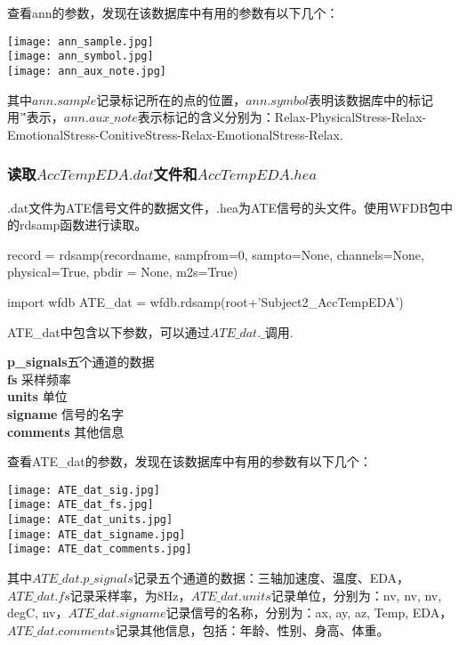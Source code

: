 \documentclass[UTF8]{ctexart}
\begin{document}
查看ann的参数，发现在该数据库中有用的参数有以下几个：
\begin{center} 
\texttt{[image: ann\_sample.jpg]}\\
\vspace{3mm}
\texttt{[image: ann\_symbol.jpg]}\\
\vspace{3mm}
\texttt{[image: ann\_aux\_note.jpg]}\\ 
\end{center}
其中$ann.sample$记录标记所在的点的位置，$ann.symbol$表明该数据库中的标记用'\''表示，$ann.aux\_note$表示标记的含义分别为：Relax-PhysicalStress-Relax-EmotionalStress-ConitiveStress-Relax-EmotionalStress-Relax.
\subsubsection{读取$AccTempEDA.dat$文件和$AccTempEDA.hea$}
.dat文件为ATE信号文件的数据文件，.hea为ATE信号的头文件。使用WFDB包中的rdsamp函数进行读取。
\begin{thm}
record = rdsamp(recordname, sampfrom=0, sampto=None, channels=None,
physical=True, pbdir = None, m2s=True)
\end{thm}
\begin{python}
import wfdb
ATE_dat = wfdb.rdsamp(root+'Subject2_AccTempEDA')
\end{python}
ATE\_dat中包含以下参数，可以通过$ATE\_dat.\_$调用.
\begin{tabbing}
\textbf{p\_signals}\quad\quad\quad\quad\quad\quad\= 五个通道的数据\\[5pt]
\textbf{fs}											\> 采样频率\\[5pt]
\textbf{units}											\> 单位\\[5pt]
\textbf{signame}										\> 信号的名字\\[5pt]
\textbf{comments}											\> 其他信息\\
\end{tabbing}
查看ATE\_dat的参数，发现在该数据库中有用的参数有以下几个：
\begin{center} 
\texttt{[image: ATE\_dat\_sig.jpg]}\\
\vspace{3mm}
\texttt{[image: ATE\_dat\_fs.jpg]}\\
\vspace{3mm}
\texttt{[image: ATE\_dat\_units.jpg]}\\
\vspace{3mm}
\texttt{[image: ATE\_dat\_signame.jpg]}\\
\vspace{3mm}
\texttt{[image: ATE\_dat\_comments.jpg]}\\ 
\end{center}
其中$ATE\_dat.p\_signals$记录五个通道的数据：三轴加速度、温度、EDA，$ATE\_dat.fs$记录采样率，为8Hz，$ATE\_dat.units$记录单位，分别为：nv, nv, nv, degC, nv，$ATE\_dat.signame$记录信号的名称，分别为：ax, ay, az, Temp, EDA，$ATE\_dat.comments$记录其他信息，包括：年龄、性别、身高、体重。
\end{document}
